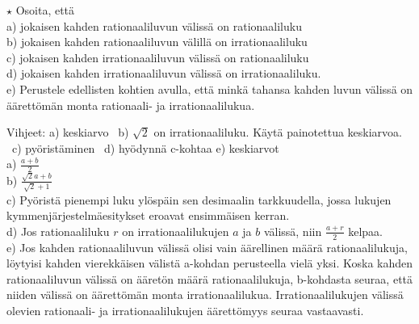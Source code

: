 \begin{tehtavasivu}
\begin{tehtava}
$\star$ Osoita, että \\
a) jokaisen kahden rationaaliluvun välissä on rationaaliluku \\
b) jokaisen kahden rationaaliluvun välillä on irrationaaliluku \\
c) jokaisen kahden irrationaaliluvun välissä on rationaaliluku \\
d) jokaisen kahden irrationaaliluvun välissä on irrationaaliluku. \\
e) Perustele edellisten kohtien avulla, että minkä tahansa kahden luvun
välissä on äärettömän monta rationaali- ja irrationaalilukua.
\begin{vastaus}
Vihjeet: a) keskiarvo \ b) $\sqrt{2}$ on irrationaaliluku. Käytä
painotettua keskiarvoa. \ c) pyöristäminen \ d) hyödynnä c-kohtaa
e) keskiarvot %
\\
a) $\frac{a+b}{2}$ \\ b) $\frac{\sqrt{2}a+b}{\sqrt{2}+1}$ \\ c) Pyöristä pienempi luku ylöspäin sen desimaalin tarkkuudella, jossa lukujen kymmenjärjestelmäesitykset eroavat ensimmäisen kerran. \\ d) Jos rationaaliluku $r$ on irrationaalilukujen $a$ ja $b$ välissä, niin $\frac{a+r}{2}$ kelpaa. \\ e) Jos kahden rationaaliluvun välissä olisi vain äärellinen määrä rationaalilukuja, löytyisi kahden vierekkäisen välistä a-kohdan perusteella vielä yksi. Koska kahden rationaaliluvun välissä on ääretön määrä rationaalilukuja, b-kohdasta seuraa, että niiden välissä on äärettömän monta irrationaalilukua. Irrationaalilukujen välissä olevien rationaali- ja irrationaalilukujen äärettömyys seuraa vastaavasti.
\end{vastaus}
\end{tehtava}

\end{tehtavasivu}
